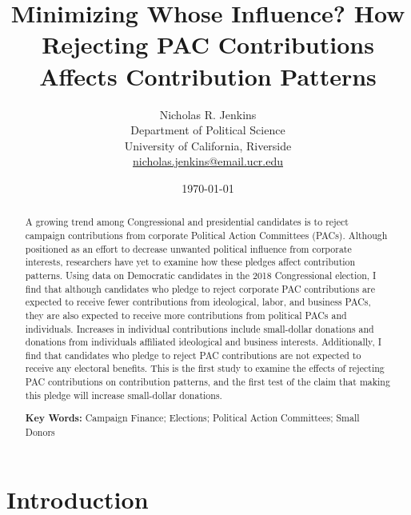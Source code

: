 \documentclass[12pt]{article}
\title{\textbf{Minimizing Whose Influence? How Rejecting PAC Contributions Affects Contribution Patterns}}
\author{Nicholas R. Jenkins \\ Department of Political Science\\ University of California, Riverside\\ \href{mailto:nicholas.jenkins@email.ucr.edu}{nicholas.jenkins@email.ucr.edu}}
\date{\today}
\begin{document}
\maketitle
\thispagestyle{empty}

\begin{abstract}

A growing trend among Congressional and presidential candidates is to reject campaign contributions from corporate Political Action Committees (PACs). Although positioned as an effort to decrease unwanted political influence from corporate interests, researchers have yet to examine how these pledges affect contribution patterns. Using data on Democratic candidates in the 2018 Congressional election, I find that although candidates who pledge to reject corporate PAC contributions are expected to receive fewer contributions from ideological, labor, and business PACs, they are also expected to receive more contributions from political PACs and individuals. Increases in individual contributions include small-dollar donations and donations from individuals affiliated ideological and business interests. Additionally, I find that candidates who pledge to reject PAC contributions are not expected to receive any electoral benefits. This is the first study to examine the effects of rejecting PAC contributions on contribution patterns, and the first test of the claim that making this pledge will increase small-dollar donations.

\medskip

\noindent \textbf{Key Words:} Campaign Finance; Elections; Political Action Committees; Small Donors

\end{abstract}

\pagebreak

\cleardoublepage
\setcounter{page}{1}

\doublespacing

\section{Introduction} \label{sec: intro}
\end{document}
